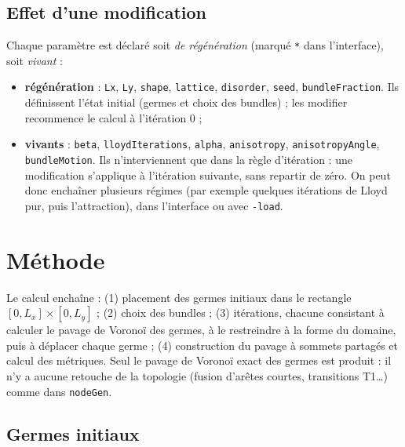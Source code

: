 \documentclass[10pt,a4paper]{article}
\newcommand{\code}[1]{\texttt{#1}}
\begin{document}
\subsection{Effet d'une modification}\label{sec:effets}

Chaque paramètre est déclaré soit \emph{de régénération} (marqué \code{*} dans l'interface), soit
\emph{vivant} :
\begin{itemize}
  \item \textbf{régénération} : \code{Lx}, \code{Ly}, \code{shape}, \code{lattice}, \code{disorder},
    \code{seed}, \code{bundleFraction}. Ils définissent l'état initial (germes et choix des bundles) ; les
    modifier recommence le calcul à l'itération 0 ;
  \item \textbf{vivants} : \code{beta}, \code{lloydIterations}, \code{alpha}, \code{anisotropy},
    \code{anisotropyAngle}, \code{bundleMotion}. Ils n'interviennent que dans la règle d'itération : une
    modification s'applique à l'itération suivante, sans repartir de zéro. On peut donc enchaîner plusieurs
    régimes (par exemple quelques itérations de Lloyd pur, puis l'attraction), dans l'interface ou avec
    \code{-load}.
\end{itemize}

\section{Méthode}\label{sec:methode}

Le calcul enchaîne : (1) placement des germes initiaux dans le rectangle $[0,L_x]\times[0,L_y]$ ; (2) choix des
bundles ; (3) itérations, chacune consistant à calculer le pavage de Voronoï des germes, à le restreindre à la
forme du domaine, puis à déplacer chaque germe ; (4) construction du pavage à sommets partagés et calcul des
métriques. Seul le pavage de Voronoï exact des germes est produit : il n'y a aucune retouche de la topologie
(fusion d'arêtes courtes, transitions T1\dots) comme dans \code{nodeGen}.

\subsection{Germes initiaux}\label{sec:germes}
\end{document}

